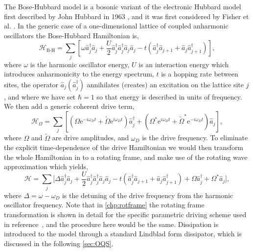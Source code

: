 The Bose-Hubbard model is a bosonic variant of the electronic Hubbard model first described by John Hubbard in 1963 \cite{Hubbard1963}, and it was first considered by Fisher et al. \cite{Fisher1989}. In the generic case of a one-dimensional lattice of coupled anharmonic oscillators the Bose-Hubbard Hamiltonian is,
\begin{equation}
	\mathcal{H}_{\text{B-H}} = \sum_{j} \left[ \omega\hat{a}_{j}^{\dagger}\hat{a}_{j} + \frac{U}{2}\hat{a}_{j}^{\dagger}\hat{a}_{j}^{\dagger}\hat{a}_{j}\hat{a}_{j} - t\left(\hat{a}_{j}^{\dagger}\hat{a}_{j+1} + \hat{a}_{j}\hat{a}_{j+1}^{\dagger}\right) \right],
	\label{eq:mbq2-1}
\end{equation}
where \(\omega\) is the harmonic oscillator energy, \(U\) is an interaction energy which introduces anharmonicity to the energy spectrum, \(t\) is a hopping rate between sites, the operator \(\hat{a}_{j} (\hat{a}_{j}^{\dagger})\) annihilates (creates) an excitation on the lattice site \(j\), and where we have set \(\hbar = 1\) so that energy is described in units of frequency. We then add a generic coherent drive term,
\begin{equation}
	\mathcal{H}_{\Omega} = \sum_{j} \left[ \left(\Omega\mathrm{e}^{-i\omega_{D}t} + \tilde{\Omega}\mathrm{e}^{i\omega_{D}t}\right) \hat{a}_{j}^{\dagger} + \left(\Omega^{*}\mathrm{e}^{i\omega_{D}t} + \tilde{\Omega}^{*}\mathrm{e}^{-i\omega_{D}t}\right)\hat{a}_{j}\right],
	\label{eq:mbq2-2}
\end{equation}
where \(\Omega\) and \(\tilde{\Omega}\) are drive amplitudes, and \(\omega_{D}\) is the drive frequency. To eliminate the explicit time-dependence of the drive Hamiltonian we would then transform the whole Hamiltonian in to a rotating frame, and make use of the rotating wave approximation which yields,
\begin{equation}
	\mathcal{H} = \sum_{j} \biggl[\Delta\hat{a}_{j}^{\dagger}\hat{a}_{j} + \frac{U}{2}\hat{a}_{j}^{\dagger}\hat{a}_{j}^{\dagger}\hat{a}_{j}\hat{a}_{j} - t\left(\hat{a}_{j}^{\dagger}\hat{a}_{j+1} + \hat{a}_{j}\hat{a}_{j+1}^{\dagger}\right) + \Omega\hat{a}_{j}^{\dagger} + \Omega^{*}\hat{a}_{j} \biggr],
	\label{eq:mbq2-3}
\end{equation}
where \(\Delta = \omega - \omega_{D}\) is the detuning of the drive frequency from the harmonic oscillator frequency. Note that in \cref{chp:rotframe} the rotating frame transformation is shown in detail for the specific parametric driving scheme used in reference~\cite{Brown2018}, and the procedure here would be the same. Dissipation is introduced to the model through a standard Lindblad form dissipator, which is discussed in the following \cref{sec:OQS}.

